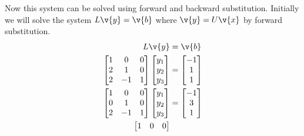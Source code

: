 \documentclass[11pt]{article}
\begin{document}
\begin{enumerate}
\begin{enumerate}
                Now this system can be solved using forward and backward
                substitution.
                Initially we will solve the system $L\v{y} = \v{b}$ where
                $\v{y} = U\v{x}$ by forward substitution.
                \begin{align*}
                    L\v{y} &= \v{b} \\
                    \begin{bmatrix}
                        1 & 0 & 0 \\
                        2 & 1 & 0 \\
                        2 & -1 & 1
                    \end{bmatrix}
                    \begin{bmatrix}
                        y_1 \\
                        y_2 \\
                        y_3
                    \end{bmatrix}
                    &=
                    \begin{bmatrix}
                        -1 \\
                        1 \\
                        1
                    \end{bmatrix} \\
                    \begin{bmatrix}
                        1 & 0 & 0 \\
                        0 & 1 & 0 \\
                        2 & -1 & 1
                    \end{bmatrix}
                    \begin{bmatrix}
                        y_1 \\
                        y_2 \\
                        y_3
                    \end{bmatrix}
                    &=
                    \begin{bmatrix}
                        -1 \\
                        3 \\
                        1
                    \end{bmatrix} \\
                    \begin{bmatrix}
                        1 & 0 & 0 \\

\end{bmatrix}
\end{align*}
\end{enumerate}
\end{enumerate}
\end{document}
